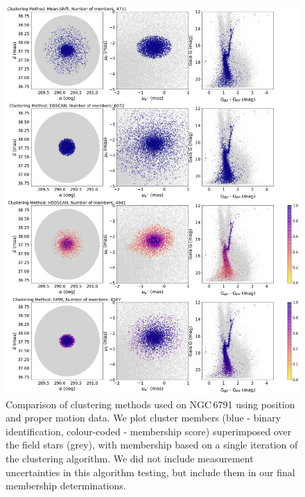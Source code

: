 \begin{figure}[hbtp]
    \centering
    \includegraphics[width=0.92\linewidth]{Chapter4/6791_cluster_comp_pospm.png}
    \caption[Clustering method comparison - NGC\,6791 (I)]{Comparison of clustering methods used on NGC\,6791 using position and proper motion data. We plot cluster members (blue - binary identification, colour-coded - membership score) superimposed over the field stars (grey), with membership based on a single iteration of the clustering algorithm. We did not include measurement uncertainties in this algorithm testing, but include them in our final membership determinations.}
    \label{fig:clustering_methods_comparison_nopara}
\end{figure}

